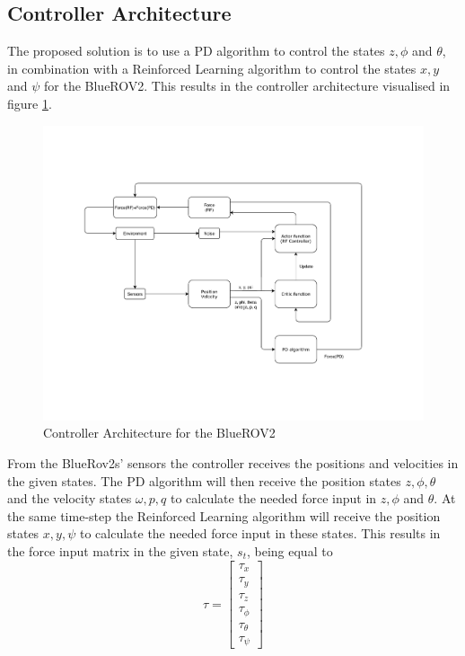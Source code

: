 \subsection{Controller Architecture}
The proposed solution is to use a PD algorithm to control the states $z, \phi$ and $\theta$, in combination with a Reinforced Learning algorithm to control the states $x, y$ and $\psi$ for the BlueROV2. This results in the controller architecture visualised in figure \ref{fig:architecture}. 
\begin{figure}[H]
    \centering
    \includegraphics[width=\textwidth, trim={1cm 4cm 1cm 3cm},clip]{images/chap4/architecture.pdf}
    \caption{Controller Architecture for the BlueROV2}
    \label{fig:architecture}
\end{figure}
From the BlueRov2s' sensors the controller receives the positions and velocities in the given states. The PD algorithm will then receive the position states $z, \phi, \theta$ and the velocity states $\omega, p, q$ to calculate the needed force input in $z, \phi$ and $\theta$. At the same time-step the Reinforced Learning algorithm will receive the position states $x, y, \psi$ to calculate the needed force input in these states. This results in the force input matrix in the given state, $s_{t}$, being equal to
\begin{equation}
    \tau = \begin{bmatrix}
    \tau_{x} \\ \tau_{y} \\ \tau_{z} \\ \tau_{\phi} \\ \tau_{\theta} \\ \tau_{\psi}
    \end{bmatrix}
\end{equation}
